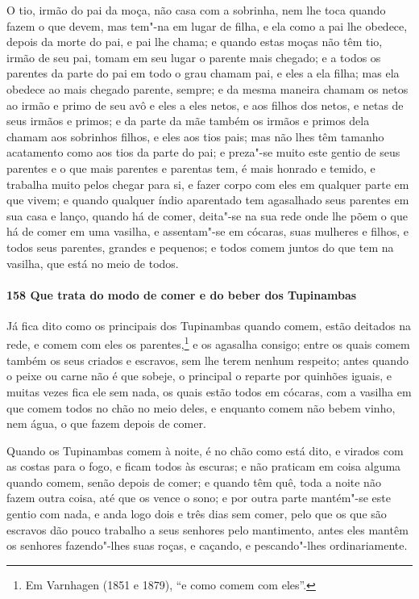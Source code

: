 \begin{linenumbers}
O tio, irmão do pai da moça, não casa com a sobrinha, nem lhe toca quando fazem o que
devem, mas tem"-na em lugar de filha, e ela como a pai lhe obedece, depois da morte do pai,
e pai lhe chama; e quando estas moças não têm tio, irmão de seu pai, tomam em seu lugar o
parente mais chegado; e a todos os parentes da parte do pai em todo o grau chamam pai, e
eles a ela filha; mas ela obedece ao mais chegado parente, sempre; e da mesma maneira
chamam os netos ao irmão e primo de seu avô e eles a eles netos, e aos filhos dos netos, e
netas de seus irmãos e primos; e da parte da mãe também os irmãos e primos dela chamam aos
sobrinhos filhos, e eles aos tios pais; mas não lhes têm tamanho acatamento como aos tios
da parte do pai; e preza"-se muito este gentio de seus parentes e o que mais parentes e
parentas tem, é mais honrado e temido, e trabalha muito pelos chegar para si, e fazer
corpo com eles em qualquer parte em que vivem; e quando qualquer índio aparentado tem
agasalhado seus parentes em sua casa e lanço, quando há de comer, deita"-se na sua rede
onde lhe põem o que há de comer em uma vasilha, e assentam"-se em cócaras, suas mulheres e
filhos, e todos seus parentes, grandes e pequenos; e todos comem juntos do que tem na
vasilha, que está no meio de todos.

\paragraph{158 Que trata do modo de comer e do beber dos Tupinambas}\quad
Já fica dito como os principais dos Tupinambas quando comem, estão deitados na rede, e
comem com eles os parentes,\footnote{ Em Varnhagen (1851 e 1879), ``e como comem com
eles''.} e os agasalha consigo; entre os quais comem também os seus criados e escravos,
sem lhe terem nenhum respeito; antes quando o peixe ou carne não é que sobeje, o principal
o reparte por quinhões iguais, e muitas vezes fica ele sem nada, os quais estão todos em
cócaras, com a vasilha em que comem todos no chão no meio deles, e enquanto comem não
bebem vinho, nem água, o que fazem depois de comer.

Quando os Tupinambas comem à noite, é no chão como está dito, e virados com as costas para
o fogo, e ficam todos às escuras; e não praticam em coisa alguma quando comem, senão
depois de comer; e quando têm quê, toda a noite não fazem outra coisa, até que os vence o
sono; e por outra parte mantém"-se este gentio com nada, e anda logo dois e três dias sem
comer, pelo que os que são escravos dão pouco trabalho a seus senhores pelo mantimento,
antes eles mantêm os senhores fazendo"-lhes suas roças, e caçando, e pescando"-lhes
ordinariamente.


\end{linenumbers}
